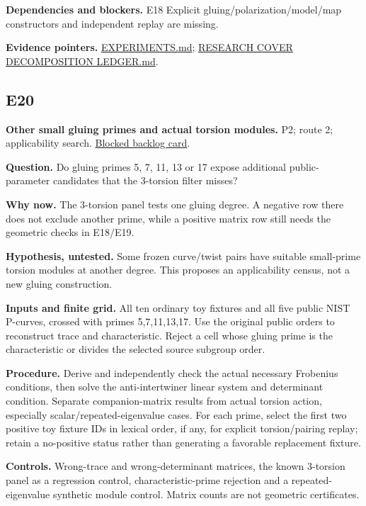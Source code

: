 \documentclass[
  10pt,
]{article}
\begin{document}
\textbf{Dependencies and blockers.} E18 Explicit
gluing/polarization/model/map constructors and independent replay are
missing.

\textbf{Evidence pointers.}
\href{../../../research/twist_routes_1_3_20261021/EXPERIMENTS.md}{EXPERIMENTS.md};
\href{../../../research/notes/index-calculus/RESEARCH_COVER_DECOMPOSITION_LEDGER.md}{RESEARCH
COVER DECOMPOSITION LEDGER.md}.

\subsection{E20}\label{e20}

\textbf{Other small gluing primes and actual torsion modules.} P2; route
2; applicability search.
\href{../../../backlog/XP-20261022-twist-higher-gluing-filters/README.md}{Blocked
backlog card}.

\textbf{Question.} Do gluing primes 5, 7, 11, 13 or 17 expose additional
public-parameter candidates that the 3-torsion filter misses?

\textbf{Why now.} The 3-torsion panel tests one gluing degree. A
negative row there does not exclude another prime, while a positive
matrix row still needs the geometric checks in E18/E19.

\textbf{Hypothesis, untested.} Some frozen curve/twist pairs have
suitable small-prime torsion modules at another degree. This proposes an
applicability census, not a new gluing construction.

\textbf{Inputs and finite grid.} All ten ordinary toy fixtures and all
five public NIST P-curves, crossed with primes 5,7,11,13,17. Use the
original public orders to reconstruct trace and characteristic. Reject a
cell whose gluing prime is the characteristic or divides the selected
source subgroup order.

\textbf{Procedure.} Derive and independently check the actual necessary
Frobenius conditions, then solve the anti-intertwiner linear system and
determinant condition. Separate companion-matrix results from actual
torsion action, especially scalar/repeated-eigenvalue cases. For each
prime, select the first two positive toy fixture IDs in lexical order,
if any, for explicit torsion/pairing replay; retain a no-positive status
rather than generating a favorable replacement fixture.

\textbf{Controls.} Wrong-trace and wrong-determinant matrices, the known
3-torsion panel as a regression control, characteristic-prime rejection
and a repeated-eigenvalue synthetic module control. Matrix counts are
not geometric certificates.
\end{document}
